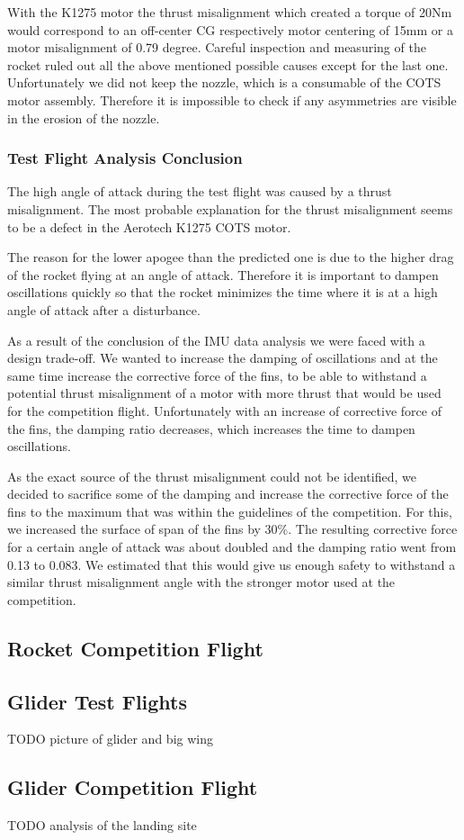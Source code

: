 With the K1275 motor the thrust misalignment which created a torque of 20Nm would correspond to an off-center CG respectively motor centering of 15mm or a motor misalignment of 0.79 degree.
Careful inspection and measuring of the rocket ruled out all the above mentioned possible causes except for the last one. Unfortunately we did not keep the nozzle, which is a consumable of the COTS motor assembly. Therefore it is impossible to check if any asymmetries are visible in the erosion of the nozzle.

\subsubsection{Test Flight Analysis Conclusion}

The high angle of attack during the test flight was caused by a thrust misalignment. The most probable explanation for the thrust misalignment seems to be a defect in the Aerotech K1275 COTS motor.

The reason for the lower apogee than the predicted one is due to the higher drag of the rocket flying at an angle of attack. Therefore it is important to dampen oscillations quickly so that the rocket minimizes the time where it is at a high angle of attack after a disturbance.

As a result of the conclusion of the IMU data analysis we were faced with a design trade-off.
We wanted to increase the damping of oscillations and at the same time increase the corrective force of the fins, to be able to withstand a potential thrust misalignment of a motor with more thrust that would be used for the competition flight.
Unfortunately with an increase of corrective force of the fins, the damping ratio decreases, which increases the time to dampen oscillations.

As the exact source of the thrust misalignment could not be identified, we decided to sacrifice some of the damping and increase the corrective force of the fins to the maximum that was within the guidelines of the competition.
For this, we increased the surface of span of the fins by 30\%. The resulting corrective force for a certain angle of attack was about doubled and the damping ratio went from 0.13 to 0.083.
We estimated that this would give us enough safety to withstand a similar thrust misalignment angle with the stronger motor used at the competition.

\subsection{Rocket Competition Flight}


\subsection{Glider Test Flights}

TODO picture of glider and big wing

\subsection{Glider Competition Flight}

TODO analysis of the landing site

